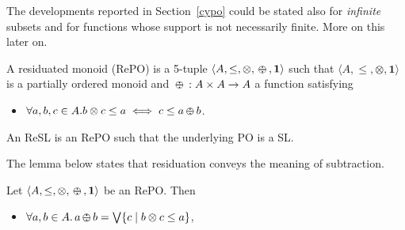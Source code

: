 \documentclass{llncs}
\def\monid{{\mathbf 0}}
\def\monop{\otimes}
\def\odiv{\, {\ominus\hspace{-7.7pt} \div} \,}
\def\monid{\mathbf{1}}
\begin{document}
\begin{remark}
The developments reported in Section~\ref{cypo} could be stated also for \emph{infinite} subsets 
and for functions whose support is not necessarily finite. More on this later on.
\end{remark}

%
%
%

\begin{definition}[residuation]
	A residuated monoid (RePO) is a 5-tuple $\langle A, \leq, \monop, \odiv, \monid \rangle$ such that
	$\langle A, \leq, \monop, \monid \rangle$ is a partially ordered monoid and
	$\odiv: A \times A \rightarrow A$ a function satisfying 
	\begin{itemize}
		\item $\forall a, b, c \in A. b \monop c \leq a \iff c \leq a \odiv b$.
	\end{itemize}
	An ReSL is an RePO such that the underlying PO is a SL.
\end{definition}

%

The lemma below states that residuation conveys the meaning of subtraction.

\begin{lemma}
	Let $\langle A, \leq, \monop, \odiv, \monid \rangle$ be an RePO.
	Then
	\begin{itemize}
		\item $\forall a, b \in A.\, a \odiv b = \bigvee \{ c \mid b \monop c \leq a\}$,
	\end{itemize}
\end{lemma}
\end{document}
